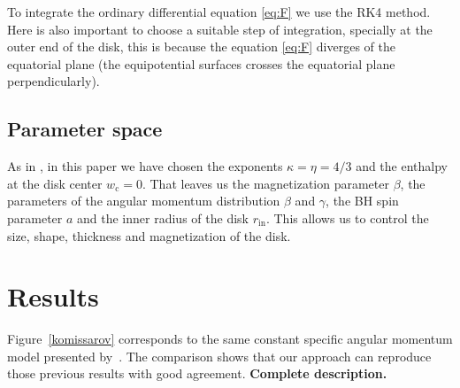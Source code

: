 \documentclass{aa}
\begin{document}
To integrate the ordinary differential equation \eqref{eq:F} we use the RK4 method. Here is also important to choose a suitable step of integration, specially at the outer end of the disk, this is because the equation \eqref{eq:F} diverges of the equatorial plane (the equipotential surfaces crosses the equatorial plane perpendicularly).

\subsection{Parameter space}

As in \citet{Komissarov:2006}, in this paper we have chosen the exponents $\kappa = \eta = 4/3$ and the enthalpy at the disk center $w_{\mathrm{c}} = 0$. That leaves us the magnetization parameter $\beta$, the parameters of the angular momentum distribution $\beta$ and $\gamma$, the BH spin parameter $a$ and the inner radius of the disk $r_{\mathrm{in}}$. This allows us to control the size, shape, thickness and magnetization of the disk.

\section{Results}

Figure~\ref{komissarov} corresponds to the same constant specific angular momentum model presented by~\citet{Komissarov:2006}. The comparison shows that our approach can reproduce those previous results with good agreement. {\bf Complete description.}
\end{document}
